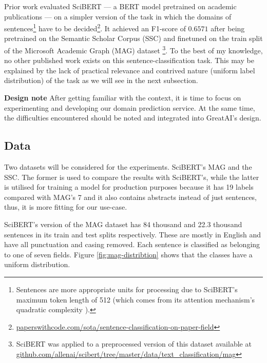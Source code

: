 Prior work evaluated SciBERT \cite{beltagy2019scibert} --- a BERT \cite{devlin2018bert} model pretrained on academic publications --- on a simpler version of the task in which the domains of sentences\footnote{Sentences are more appropriate units for processing due to SciBERT's maximum token length of 512 (which comes from its attention mechanism's quadratic complexity \cite{vaswani2017attention}).} have to be decided\footnote{\href{https://paperswithcode.com/sota/sentence-classification-on-paper-field}{paperswithcode.com/sota/sentence-classification-on-paper-field}}. It achieved an F1-score of $0.6571$ after being pretrained on the Semantic Scholar Corpus (SSC) \cite{Lo2020S2ORCTS} and finetuned on the train split of the Microsoft Academic Graph (MAG) dataset \cite{wang2019review}\footnote{SciBERT was applied to a preprocessed version of this dataset available at \href{https://github.com/allenai/scibert/tree/master/data/text_classification/mag}{github.com/allenai/scibert/tree/master/data/text\_classification/mag}}. To the best of my knowledge, no other published work exists on this sentence-classification task. This may be explained by the lack of practical relevance and contrived nature (uniform label distribution) of the task as we will see in the next subsection.

\begin{displayquote}
\textbf{Design note} After getting familiar with the context, it is time to focus on experimenting and developing our domain prediction service. At the same time, the difficulties encountered should be noted and integrated into GreatAI's design.
\end{displayquote}

\subsection{Data}

Two datasets will be considered for the experiments. SciBERT's MAG and the SSC. The former is used to compare the results with SciBERT's, while the latter is utilised for training a model for production purposes because it has 19 labels compared with MAG's 7 and it also contains abstracts instead of just sentences, thus, it is more fitting for our use-case.

SciBERT's version of the MAG dataset has 84 thousand and 22.3 thousand sentences in its train and test splits respectively. These are mostly in English and have all punctuation and casing removed. Each sentence is classified as belonging to one of seven fields. Figure \ref{fig:mag-distribtion} shows that the classes have a uniform distribution. 

